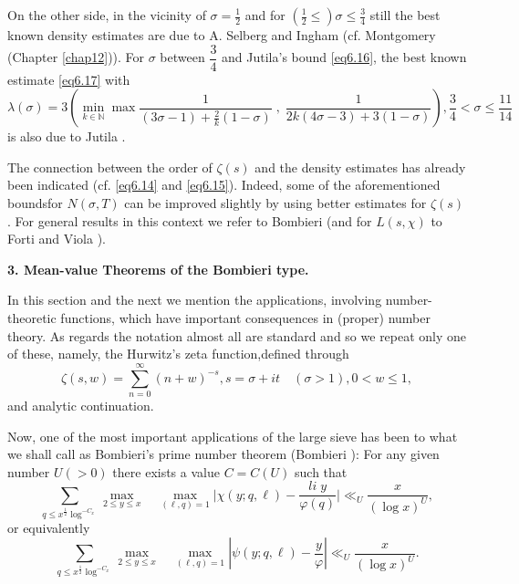 On the other side, in the vicinity of $\sigma = \frac{1}{2}$ and for
$(\frac{1}{2}\leq)\sigma \leq \frac{3}{4}$ still the best known
density estimates are due to A. Selberg and Ingham (cf. Montgomery
\cite{key5} (Chapter \ref{chap12})). For $\sigma$ between $\dfrac{3}{4}$ and
Jutila's bound \eqref{eq6.16}, the best known estimate \eqref{eq6.17} with 
{\fontsize{9pt}{11pt}\selectfont
\begin{equation*}
\lambda(\sigma) = 3 (\underset{k \in \mathbb{N}}{\min} \max
\frac{1}{(3\sigma -1) + \frac{2}{k}(1-\sigma)} \; , \; \frac{1}{2k(4\sigma
  -3)+3(1-\sigma )}),\frac{3}{4} < \sigma \leq \frac{11}{14}
\tag{6.21}\label{eq6.21}  
\end{equation*}}\relax
is also due to Jutila \cite{key10}.

The connection between the order of $\zeta(s)$ and the density
estimates has already been indicated (cf. \eqref{eq6.14} and
\eqref{eq6.15}). Indeed, some of the aforementioned
bounds\pageoriginale for $N(\sigma,T)$ 
can be improved slightly by using better estimates for $\zeta(s)$. For
general results in this context we refer to Bombieri \cite{key3} (and for
$L(s,\chi)$ to Forti and Viola \cite{key1}). 

\medskip
\noindent
{\bf 3. Mean-value Theorems of the Bombieri type.}
\smallskip

In this section and the next we mention the applications, involving
number-theoretic functions, which have important consequences in\break
(proper) number theory. As regards the notation almost all are
standard and so we repeat only one of these, namely, the Hurwitz's
zeta function,defined through 
\begin{equation*}
\zeta (s,w) = \sum_{n=0}^{\infty} (n+w)^{-s}, s = \sigma + it \quad
(\sigma > 1),0 < w \leq 1, \tag{6.22}\label{eq6.22}  
\end{equation*}
and analytic continuation.

Now, one of the most important applications of the large sieve has
been to what we shall call as Bombieri's prime number theorem\break 
(Bombieri \cite{key1}): For any given number $U(>0)$ there exists a value $C
= C(U)$ such that 
\begin{equation*}
\sum_{q \leq x^{\frac{1}{2}}\log^{-C_x}}\underset{2\leq y \leq
  x}{\max} \quad \underset{(\ell ,q) = 1} {\max} \Big| \chi (y; q,\ell
) - \frac{li \;  y}{\varphi (q)} \Big| \ll_U \frac{x}{(\log x)^{U}},
\tag{6.23}\label{eq6.23}   
\end{equation*}
or equivalently
\begin{equation*}
\sum_{q \leq x^{\frac{1}{2}}\log^{-C_x}}\underset{2 \leq y \leq
  x}{\max}\quad \underset{(\ell,q)=1}{\max} | \psi(y;q,\ell) -
\frac{y}{\varphi} | \ll_{U} \frac{x}{(\log
  x)^U}. \tag{6.24}\label{eq6.24}   
\end{equation*}

